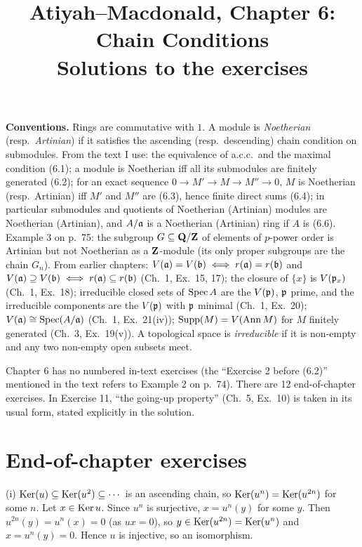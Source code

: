 \documentclass[11pt]{article}
\title{Atiyah--Macdonald, Chapter 6: Chain Conditions\\[2pt]\large Solutions to the exercises}
\author{}
\date{}
\begin{document}
\maketitle
\noindent\textbf{Conventions.} Rings are commutative with $1$. A module is \emph{Noetherian} (resp.\ \emph{Artinian}) if it satisfies the ascending (resp.\ descending) chain condition on submodules. From the text I use: the equivalence of a.c.c.\ and the maximal condition (6.1); a module is Noetherian iff all its submodules are finitely generated (6.2); for an exact sequence $0\to M'\to M\to M''\to0$, $M$ is Noetherian (resp.\ Artinian) iff $M'$ and $M''$ are (6.3), hence finite direct sums (6.4); in particular submodules and quotients of Noetherian (Artinian) modules are Noetherian (Artinian), and $A/\mathfrak a$ is a Noetherian (Artinian) ring if $A$ is (6.6). Example 3 on p.~75: the subgroup $G\subseteq\mathbf Q/\mathbf Z$ of elements of $p$-power order is Artinian but not Noetherian as a $\mathbf Z$-module (its only proper subgroups are the chain $G_n$). From earlier chapters: $V(\mathfrak a)=V(\mathfrak b)\iff r(\mathfrak a)=r(\mathfrak b)$ and $V(\mathfrak a)\supseteq V(\mathfrak b)\iff r(\mathfrak a)\subseteq r(\mathfrak b)$ (Ch.~1, Ex.~15, 17); the closure of $\{x\}$ is $V(\mathfrak p_x)$ (Ch.~1, Ex.~18); irreducible closed sets of $\operatorname{Spec} A$ are the $V(\mathfrak p)$, $\mathfrak p$ prime, and the irreducible components are the $V(\mathfrak p)$ with $\mathfrak p$ minimal (Ch.~1, Ex.~20); $V(\mathfrak a)\cong\operatorname{Spec}(A/\mathfrak a)$ (Ch.~1, Ex.~21(iv)); $\operatorname{Supp}(M)=V(\operatorname{Ann} M)$ for $M$ finitely generated (Ch.~3, Ex.~19(v)). A topological space is \emph{irreducible} if it is non-empty and any two non-empty open subsets meet.

Chapter 6 has no numbered in-text exercises (the ``Exercise 2 before (6.2)'' mentioned in the text refers to Example 2 on p.~74). There are 12 end-of-chapter exercises. In Exercise 11, ``the going-up property'' (Ch.~5, Ex.~10) is taken in its usual form, stated explicitly in the solution.

\section*{End-of-chapter exercises}

\pf
(i) $\operatorname{Ker}(u)\subseteq\operatorname{Ker}(u^2)\subseteq\cdots$ is an ascending chain, so $\operatorname{Ker}(u^n)=\operatorname{Ker}(u^{2n})$ for some $n$. Let $x\in\operatorname{Ker} u$. Since $u^n$ is surjective, $x=u^n(y)$ for some $y$. Then $u^{2n}(y)=u^n(x)=0$ (as $ux=0$), so $y\in\operatorname{Ker}(u^{2n})=\operatorname{Ker}(u^n)$ and $x=u^n(y)=0$. Hence $u$ is injective, so an isomorphism.
\end{document}

